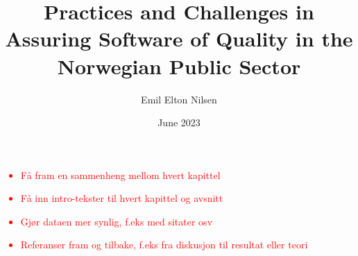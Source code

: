 \documentclass[american,titlepage,12pt]{ntnuthesis}
\title{Practices and Challenges in Assuring Software of Quality in the Norwegian Public Sector}
\author{Emil Elton Nilsen}
\date{June 2023}
\begin{document}
\textcolor{red}{
\begin{itemize}
    \item Få fram en sammenheng mellom hvert kapittel
    \item Få inn intro-tekster til hvert kapittel og avsnitt
    \item Gjør dataen mer synlig, f.eks med sitater osv
    \item Referanser fram og tilbake, f.eks fra diskusjon til resultat eller teori
\end{itemize}
}




\tableofcontents
\listoftables

\printglossary[type=\acronymtype] %
\printglossary                    %









\chapter*{\bibname}
\printbibliography[heading=none]
\end{document}
